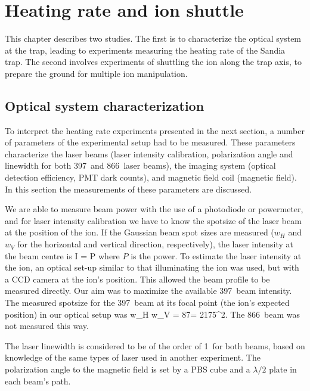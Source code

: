 \setcounter{chapter}{6} %
\chapter{Heating rate and ion shuttle}
\label{chapter:heating}

This chapter describes two studies. The first is to characterize the optical system at the trap, leading to experiments measuring the heating rate of the Sandia trap. The second involves experiments of shuttling the ion along	 the trap axis, to prepare the ground for multiple ion manipulation.  

\section{Optical system characterization}

To interpret the heating rate experiments presented in the next section, a number of parameters of the experimental setup had to be measured. These parameters characterize the laser beams (laser intensity calibration, polarization angle and linewidth for both 397\nm\, and 866\nm\, laser beams), the imaging system (optical detection efficiency, PMT dark counts), and magnetic field coil (magnetic field). In this section the measurements of these parameters are discussed.

We are able to measure beam power with the use of a photodiode or powermeter, and for laser intensity calibration we have to know the spotsize of the laser beam at the position of the ion. If the Gaussian beam spot sizes are measured ($w_H$ and $w_V$ for the horizontal and vertical direction, respectively), the laser intensity  at the beam centre is
\be
I =  P
\label{eq:laserint}
\ee
where $P$ is the power. To estimate the laser intensity at the ion, an optical set-up similar to that illuminating the ion was used, but with a CCD camera at the ion's position. This allowed the beam profile to be measured directly. Our aim was to maximize the available 397\nm\, beam intensity. The measured spotsize for the 397\nm\, beam at its focal point (the ion's expected position) in our optical setup was
\be
w_H w_V = 87\um {}\um = 2175\um^2. 
\ee
The 866\nm\, beam was not measured this way.

The laser linewidth is considered to be of the order of 1\MHz\, for both beams, based on knowledge of the same types of laser used in another experiment. The polarization angle to the magnetic field is set by a PBS cube and a $\lambda/2$ plate in each beam's path. 

